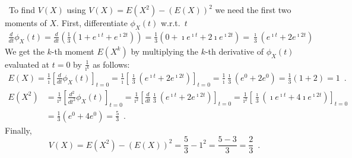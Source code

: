 \begin{ExerciseList}
\item~To find $V(X)$ using $V(X)=E(X^2)-(E(X))^2$ we need the first two moments of $X$.  First, differentiate $\phi_X(t)$ w.r.t.~$t$
\begin{align*}
\frac{d}{dt}\phi_X(t)
= \frac{d}{dt} \left( \frac{1}{3} \left(1+e^{\imath t} + e^{\imath 2 t}\right) \right)
= \frac{1}{3} \left(0+ \imath e^{\imath t} + 2 \imath e^{\imath 2 t} \right)
= \frac{\imath}{3} \left(e^{\imath t} + 2 e^{\imath 2 t} \right)
\end{align*}
We get the $k$-th moment $E(X^k)$ by multiplying the $k$-th derivative of $\phi_X(t)$ evaluated at $t=0$ by $\frac{1}{\imath^k}$ as follows:
\begin{align*}
E(X) 
= \frac{1}{\imath} \left[ \frac{d}{dt}\phi_X(t) \right]_{t=0} 
= \frac{1}{\imath} \left[ \frac{\imath}{3} \left(e^{\imath t} + 2 e^{\imath 2 t} \right)\right]_{t=0} 
= \frac{1}{\imath} \frac{\imath}{3} \left(e^0+2e^0\right) = \frac{1}{3}(1+2)=1 \enspace .
\end{align*}
\begin{align*}
E(X^2) 
&= \frac{1}{\imath^2} \left[ \frac{d^2}{dt^2}\phi_X(t) \right]_{t=0} 
= \frac{1}{\imath^2} \left[ \frac{d}{dt} \frac{\imath}{3} \left(e^{\imath t} + 2 e^{\imath 2 t} \right) \right]_{t=0}
= \frac{1}{\imath^2} \left[ \frac{\imath}{3} \left(\imath e^{\imath t} + 4 \imath e^{\imath 2 t} \right) \right]_{t=0}\\
& = \frac{1}{3} \left(e^0 + 4 e^0\right) = \frac{5}{3} \enspace .
\end{align*}
Finally,
\[
V(X) = E(X^2)-(E(X))^2 = \frac{5}{3} - 1^2 = \frac{5-3}{3}=\frac{2}{3} \enspace .
\] 
\ee


\end{ExerciseList}
